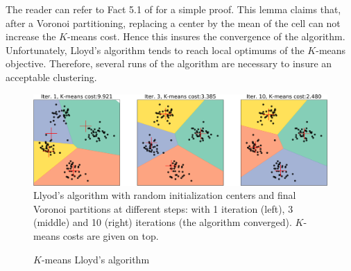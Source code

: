 The reader can refer to Fact 5.1 of \cite{hennig2015handbook} for a simple proof. This lemma claims that, after a Voronoi partitioning, replacing a center by the mean of the cell can not increase the $K$-means cost. Hence this insures the convergence of the algorithm.
 Unfortunately, Lloyd's algorithm tends to reach local optimums of the $K$-means objective. Therefore, several runs of the algorithm are necessary to insure an acceptable clustering.
 \begin{figure}[h]
 \center
 \includegraphics[scale=0.35]{TeX_files/voronoi_kmeans.png}
 \caption{Llyod's algorithm with random initialization centers and final Voronoi partitions at different steps: with 1 iteration (left), 3  (middle) and 10 (right) iterations (the algorithm converged). $K$-means costs are given on top.}
 \label{voronoi_graph}
 \end{figure}
\begin{figure}[h]
\begin{center}
   \caption{$K$-means Lloyd's algorithm}
   \label{algo:lloyd_algo}
\end{center}
\vspace{-15pt}
\end{figure}
